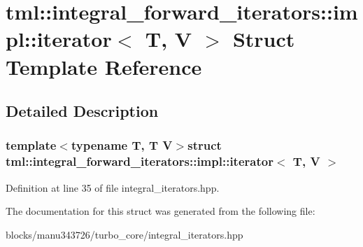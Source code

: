 \hypertarget{structtml_1_1integral__forward__iterators_1_1impl_1_1iterator}{\section{tml\+:\+:integral\+\_\+forward\+\_\+iterators\+:\+:impl\+:\+:iterator$<$ T, V $>$ Struct Template Reference}
\label{structtml_1_1integral__forward__iterators_1_1impl_1_1iterator}
}


\subsection{Detailed Description}
\subsubsection*{template$<$typename T, T V$>$struct tml\+::integral\+\_\+forward\+\_\+iterators\+::impl\+::iterator$<$ T, V $>$}



Definition at line 35 of file integral\+\_\+iterators.\+hpp.



The documentation for this struct was generated from the following file\+:\begin{DoxyCompactItemize}
\item 
blocks/manu343726/turbo\+\_\+core/integral\+\_\+iterators.\+hpp\end{DoxyCompactItemize}
